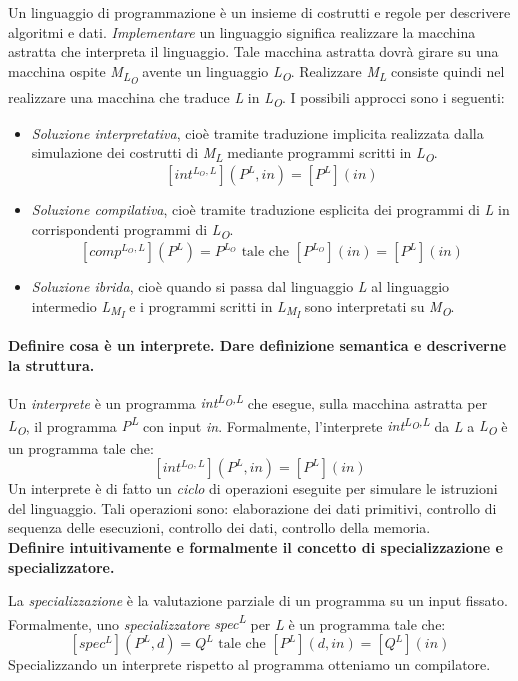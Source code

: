 \documentclass[a4paper,oneside,titlepage]{book}
\begin{document}
Un linguaggio di programmazione è un insieme di costrutti e regole per descrivere algoritmi e dati. \emph{Implementare} un linguaggio significa realizzare la macchina astratta che interpreta il linguaggio. Tale macchina astratta dovrà girare su una macchina ospite \textit{M\textsubscript{L\textsubscript{O}}} avente un linguaggio \textit{L\textsubscript{O}}. Realizzare \textit{M\textsubscript{L}} consiste quindi nel realizzare una macchina che traduce \textit{L} in \textit{L\textsubscript{O}}. I possibili approcci sono i seguenti:
\begin{itemize}
	\item \emph{Soluzione interpretativa}, cioè tramite traduzione implicita realizzata dalla simulazione dei costrutti di \textit{M\textsubscript{L}} mediante programmi scritti in \textit{L\textsubscript{O}}.
	\[ [int^{L_{O},L}](P^{L},in) = [P^{L}](in) \]
	\item \emph{Soluzione compilativa}, cioè tramite traduzione esplicita dei programmi di \textit{L} in corrispondenti programmi di \textit{L\textsubscript{O}}.
	\[ [comp^{L_{O},L}](P^{L}) = P^{L_{O}} \text{ tale che } [P^{L_{O}}](in) = [P^{L}](in) \]
	\item \emph{Soluzione ibrida}, cioè quando si passa dal linguaggio \textit{L} al linguaggio intermedio \textit{L\textsubscript{M\textsubscript{I}}} e i programmi scritti in \textit{L\textsubscript{M\textsubscript{I}}} sono interpretati su \textit{M\textsubscript{O}}.
\end{itemize}
\newpage
\noindent
\textbf{Definire cosa è un interprete. Dare definizione semantica e descriverne la struttura.}

Un \emph{interprete} è un programma \textit{int\textsuperscript{L\textsubscript{O},L}} che esegue, sulla macchina astratta per \textit{L\textsubscript{O}}, il programma \textit{P\textsuperscript{L}} con input \textit{in}. Formalmente, l'interprete \textit{int\textsuperscript{L\textsubscript{O},L}} da \textit{L} a \textit{L\textsubscript{O}} è un programma tale che:
\[ [int^{L_{O},L}](P^{L},in) = [P^{L}](in) \]
Un interprete è di fatto un \emph{ciclo} di operazioni eseguite per simulare le istruzioni del linguaggio. Tali operazioni sono: elaborazione dei dati primitivi, controllo di sequenza delle esecuzioni, controllo dei dati, controllo della memoria.
\bigskip
\\
\textbf{Definire intuitivamente e formalmente il concetto di specializzazione e specializzatore.}

La \emph{specializzazione} è la valutazione parziale di un programma su un input fissato. Formalmente, uno \emph{specializzatore} \textit{spec\textsuperscript{L}} per \textit{L} è un programma tale che:
\[ [spec^{L}](P^{L},d) = Q^{L} \text{ tale che } [P^{L}](d,in) = [Q^{L}](in) \]
Specializzando un interprete rispetto al programma otteniamo un compilatore.
\end{document}
